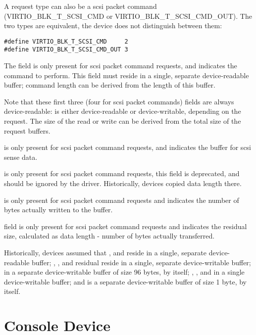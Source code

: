 A request type can also be a scsi packet command (VIRTIO_BLK_T_SCSI_CMD or
VIRTIO_BLK_T_SCSI_CMD_OUT).  The two types are equivalent, the device
does not distinguish between them:

\begin{lstlisting}
#define VIRTIO_BLK_T_SCSI_CMD     2
#define VIRTIO_BLK_T_SCSI_CMD_OUT 3
\end{lstlisting}

The  field is only present for scsi packet command requests,
and indicates the command to perform. This field must reside in a
single, separate device-readable buffer; command length can be derived
from the length of this buffer.

Note that these first three (four for scsi packet commands)
fields are always device-readable:  is either device-readable
or device-writable, depending on the request. The size of the read or
write can be derived from the total size of the request buffers.

 is only present for scsi packet command requests,
and indicates the buffer for scsi sense data.

 is only present for scsi packet command
requests, this field is deprecated, and should be ignored by the
driver. Historically, devices copied data length there.

 is only present for scsi packet command
requests and indicates the number of bytes actually written to
the  buffer.

 field is only present for scsi packet command
requests and indicates the residual size, calculated as data
length - number of bytes actually transferred.

Historically, devices assumed that ,  and
 reside in a single, separate device-readable buffer;
, ,  and residual reside in a single,
separate device-writable buffer;  in a separate
device-writable buffer of size 96 bytes, by itself; ,
,  and  in a single device-writable buffer;
and  is a separate device-writable buffer of size 1
byte, by itself.


\section{Console Device}\label{sec:Device Types / Console Device}

